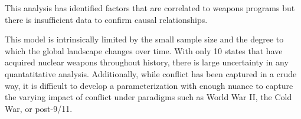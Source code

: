 This analysis has identified factors that are correlated to weapons programs but there is insufficient data to confirm causal relationships.   

This model is intrinsically limited by the small sample size and the degree to which the global landscape changes over time. With only 10 states that have acquired nuclear weapons throughout history, there is large uncertainty in any quantatitative analysis. Additionally, while conflict has been captured in a crude way, it is difficult to develop a parameterization with enough nuance to capture the varying impact of conflict under paradigms such as World War II, the Cold War, or post-9/11.

